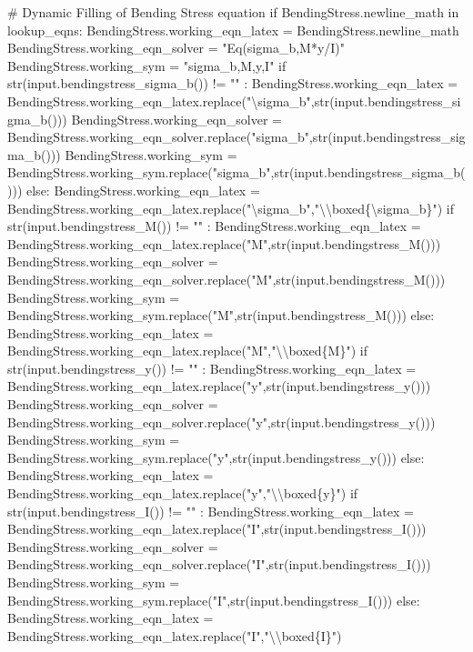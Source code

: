 \documentclass[
  letterpaper,
  DIV=11,
  numbers=noendperiod]{scrreprt}
\newenvironment{Shaded}{\begin{snugshade}}{\end{snugshade}}
\newcommand{\NormalTok}[1]{\textcolor[rgb]{0.00,0.23,0.31}{#1}}
\begin{document}
\begin{Shaded}
\begin{Highlighting}[]
\NormalTok{        \# Dynamic Filling of Bending Stress equation }
\NormalTok{        if BendingStress.newline\_math in lookup\_eqns:}
\NormalTok{            BendingStress.working\_eqn\_latex = BendingStress.newline\_math}
\NormalTok{            BendingStress.working\_eqn\_solver = "Eq(sigma\_b,M*y/I)"}
\NormalTok{            BendingStress.working\_sym = "sigma\_b,M,y,I"}
\NormalTok{            if str(input.bendingstress\_sigma\_b()) != "" : }
\NormalTok{                BendingStress.working\_eqn\_latex = BendingStress.working\_eqn\_latex.replace("\textbackslash{}sigma\_b",str(input.bendingstress\_sigma\_b()))}
\NormalTok{                BendingStress.working\_eqn\_solver = BendingStress.working\_eqn\_solver.replace("sigma\_b",str(input.bendingstress\_sigma\_b()))}
\NormalTok{                BendingStress.working\_sym = BendingStress.working\_sym.replace("sigma\_b",str(input.bendingstress\_sigma\_b()))}
\NormalTok{            else:}
\NormalTok{                BendingStress.working\_eqn\_latex = BendingStress.working\_eqn\_latex.replace("\textbackslash{}sigma\_b","\textbackslash{}\textbackslash{}boxed\{\textbackslash{}sigma\_b\}")}
\NormalTok{            if str(input.bendingstress\_M()) != "" : }
\NormalTok{                BendingStress.working\_eqn\_latex = BendingStress.working\_eqn\_latex.replace("M",str(input.bendingstress\_M()))}
\NormalTok{                BendingStress.working\_eqn\_solver = BendingStress.working\_eqn\_solver.replace("M",str(input.bendingstress\_M()))}
\NormalTok{                BendingStress.working\_sym = BendingStress.working\_sym.replace("M",str(input.bendingstress\_M()))}
\NormalTok{            else:}
\NormalTok{                BendingStress.working\_eqn\_latex = BendingStress.working\_eqn\_latex.replace("M","\textbackslash{}\textbackslash{}boxed\{M\}")}
\NormalTok{            if str(input.bendingstress\_y()) != "" : }
\NormalTok{                BendingStress.working\_eqn\_latex = BendingStress.working\_eqn\_latex.replace("y",str(input.bendingstress\_y()))}
\NormalTok{                BendingStress.working\_eqn\_solver = BendingStress.working\_eqn\_solver.replace("y",str(input.bendingstress\_y()))}
\NormalTok{                BendingStress.working\_sym = BendingStress.working\_sym.replace("y",str(input.bendingstress\_y()))}
\NormalTok{            else:}
\NormalTok{                BendingStress.working\_eqn\_latex = BendingStress.working\_eqn\_latex.replace("y","\textbackslash{}\textbackslash{}boxed\{y\}")}
\NormalTok{            if str(input.bendingstress\_I()) != "" : }
\NormalTok{                BendingStress.working\_eqn\_latex = BendingStress.working\_eqn\_latex.replace("I",str(input.bendingstress\_I()))}
\NormalTok{                BendingStress.working\_eqn\_solver = BendingStress.working\_eqn\_solver.replace("I",str(input.bendingstress\_I()))}
\NormalTok{                BendingStress.working\_sym = BendingStress.working\_sym.replace("I",str(input.bendingstress\_I()))}
\NormalTok{            else:}
\NormalTok{                BendingStress.working\_eqn\_latex = BendingStress.working\_eqn\_latex.replace("I","\textbackslash{}\textbackslash{}boxed\{I\}")}
            

\end{Highlighting}
\end{Shaded}
\end{document}
